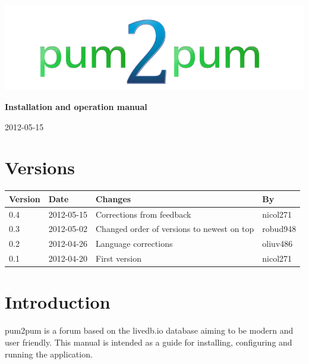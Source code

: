 \documentclass[a4paper, 12pt, titlepage]{article}
\begin{document}
\setlength{\parindent}{0pt}
	
	\begin{titlepage}
		
		\includegraphics[scale=0.4]{logoNormal.png}
		
		\vspace{6cm}
		
		\begin{center}
			\Huge{\textbf{Installation and operation manual}} %
			
			\vspace{0.5cm}
			
			\huge{2012-05-15} %
		\end{center}
		
	\end{titlepage}
	
	\tableofcontents
	\newpage
	
	\section*{Versions}
	\begin{tabularx}{1\textwidth}{|l|l|X|l|}
		\hline
		\bf{Version} & \bf{Date} & \bf{Changes} & \bf{By} \\
		\hline
		0.4 & 2012-05-15 & Corrections from feedback & nicol271 \\		
		\hline 
		0.3 & 2012-05-02 & Changed order of versions to newest on top & robud948 \\
		\hline
		0.2 & 2012-04-26 & Language corrections & oliuv486 \\		
		\hline
		0.1 & 2012-04-20 & First version & nicol271 \\
		\hline
	\end{tabularx}
	\newpage
	
	\section{Introduction}
	pum2pum is a forum based on the livedb.io database aiming to be modern and user friendly. This manual is intended as a guide for installing, configuring and running the application. 
\end{document}
